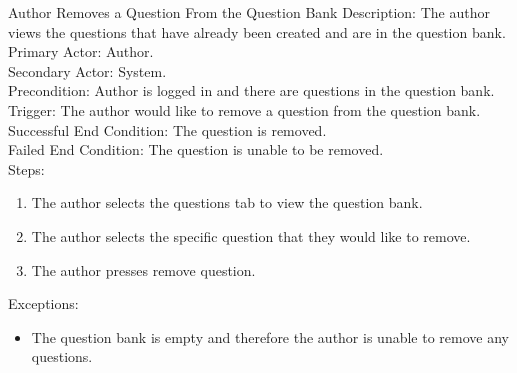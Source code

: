     
    \begin{section}{Author Removes a Question From the Question Bank}
    Description: The author views the questions that have already been created and are in the question bank. \\
        Primary Actor: Author.  \\
        Secondary Actor: System. \\
        Precondition: Author is logged in and there are questions in the question bank.\\
        Trigger: The author would like to remove a question from the question bank. \\
        Successful End Condition:  The question is removed. \\
        Failed End Condition: The question is unable to be removed.\\
        \newline
        Steps:
        \begin{enumerate}
            \item{The author selects the questions tab to view the question bank.}
            \item{The author selects the specific question that they would like to remove.}
            \item{The author presses remove question.}
        \end{enumerate}
        Exceptions:
        \begin{itemize}
            \item{The question bank is empty and therefore the author is unable to remove any questions.}
        \end{itemize}
    \end{section}
    
